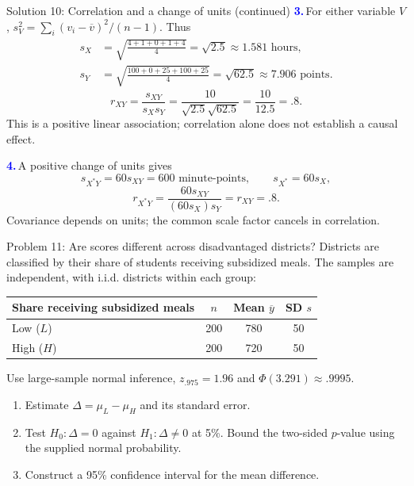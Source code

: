 \documentclass[notes,10pt, aspectratio=169]{beamer}
\newcommand{\answerpart}[1]{\textcolor{blue}{\textbf{#1.}}\,}
\begin{document}
\begin{frame}{Solution 10: Correlation and a change of units (continued)}
\small
\answerpart{3}For either variable $V$, $s_V^2=\sum_i(v_i-\overline v)^2/(n-1)$. Thus
\[
\begin{aligned}
s_X&=\sqrt{\frac{4+1+0+1+4}{4}}=\sqrt{2.5}\approx1.581\text{ hours},\\
s_Y&=\sqrt{\frac{100+0+25+100+25}{4}}=\sqrt{62.5}\approx7.906\text{ points}.
\end{aligned}
\]
\[
r_{XY}=\frac{s_{XY}}{s_Xs_Y}=\frac{10}{\sqrt{2.5}\sqrt{62.5}}
=\frac{10}{12.5}=\boxed{.8}.
\]
This is a positive linear association; correlation alone does not establish a causal effect.
\vspace{.2cm}

\answerpart{4}A positive change of units gives
\[
s_{X^*Y}=60s_{XY}=600\text{ minute-points},\qquad s_{X^*}=60s_X,
\]
\[
r_{X^*Y}=\frac{60s_{XY}}{(60s_X)s_Y}=r_{XY}=.8.
\]
Covariance depends on units; the common scale factor cancels in correlation.
\end{frame}
\fi

\begin{frame}{Problem 11: Are scores different across disadvantaged districts?}
Districts are classified by their share of students receiving subsidized meals. The samples are independent, with i.i.d. districts within each group:
\begin{center}
\begin{tabular}{lccc}
\toprule
Share receiving subsidized meals & $n$ & Mean $\overline y$ & SD $s$ \\
\midrule
Low ($L$) & 200 & 780 & 50 \\
High ($H$) & 200 & 720 & 50 \\
\bottomrule
\end{tabular}
\end{center}
Use large-sample normal inference, $z_{.975}=1.96$ and $\Phi(3.291)\approx.9995$.
\begin{enumerate}
\setlength{\itemsep}{6pt}
\item Estimate $\Delta=\mu_L-\mu_H$ and its standard error.
\item Test $H_0:\Delta=0$ against $H_1:\Delta\ne0$ at 5\%. Bound the two-sided $p$-value using the supplied normal probability.
\item Construct a 95\% confidence interval for the mean difference.
\end{enumerate}
\end{frame}
\end{document}
